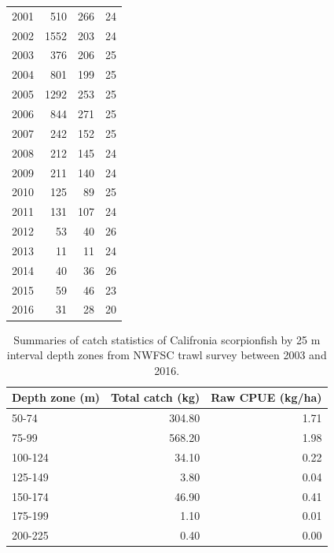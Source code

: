 \documentclass[12pt,]{article}
\begin{document}
\begin{table}[ht]
{\begin{tabular}{rrrr}
  2001 & 510 & 266 & 24 \\ 
  2002 & 1552 & 203 & 24 \\ 
  2003 & 376 & 206 & 25 \\ 
  2004 & 801 & 199 & 25 \\ 
  2005 & 1292 & 253 & 25 \\ 
  2006 & 844 & 271 & 25 \\ 
  2007 & 242 & 152 & 25 \\ 
  2008 & 212 & 145 & 24 \\ 
  2009 & 211 & 140 & 24 \\ 
  2010 & 125 & 89 & 25 \\ 
  2011 & 131 & 107 & 24 \\ 
  2012 & 53 & 40 & 26 \\ 
  2013 & 11 & 11 & 24 \\ 
  2014 & 40 & 36 & 26 \\ 
  2015 & 59 & 46 & 23 \\ 
  2016 & 31 & 28 & 20 \\ 
   \hline
\end{tabular}
}
\end{table}

\FloatBarrier

\begin{table}[ht]
\centering
\caption{Summaries of catch statistics of 
                                          Califronia scorpionfish by 25 m interval depth zones 
                                          from NWFSC trawl survey between 2003 and 2016.} 
\label{tab:Fleet8_NWFSCTrawl_catchdepth}
\begin{tabular}{lrr}
  \hline
Depth zone (m) & Total catch (kg) & Raw CPUE (kg/ha) \\ 
  \hline
50-74 & 304.80 & 1.71 \\ 
  75-99 & 568.20 & 1.98 \\ 
  100-124 & 34.10 & 0.22 \\ 
  125-149 & 3.80 & 0.04 \\ 
  150-174 & 46.90 & 0.41 \\ 
  175-199 & 1.10 & 0.01 \\ 
  200-225 & 0.40 & 0.00 \\ 
   \hline
\end{tabular}
\end{table}\vspace{2in}
\end{document}
